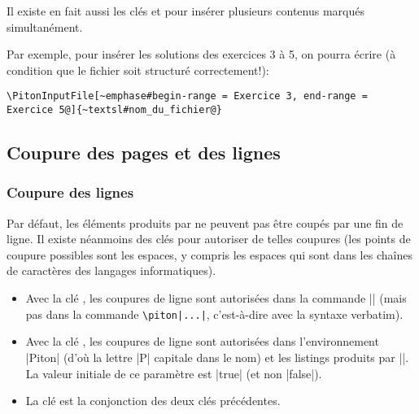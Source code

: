 \documentclass[dvipsnames,svgnames]{article}
\begin{document}
\bigskip
{}  Il existe en fait aussi les clés
 et  pour insérer plusieurs contenus marqués
simultanément.

Par exemple, pour insérer les solutions des exercices 3 à 5, on pourra écrire (à condition
que le fichier soit structuré correctement!):

\begin{Verbatim}
\PitonInputFile[~emphase#begin-range = Exercice 3, end-range = Exercice 5@]{~textsl#nom_du_fichier@}
\end{Verbatim}




\subsection{Coupure des pages et des lignes}

\label{breakable}

\subsubsection{Coupure des lignes}

\label{line-breaks}

Par défaut, les éléments produits par  ne peuvent pas être coupés par une fin
de ligne. Il existe néanmoins des clés pour autoriser de telles coupures (les points de
coupure possibles sont les espaces, y compris les espaces qui sont dans les chaînes de
caractères des langages informatiques).
\begin{itemize}
\item {} Avec la clé
, les coupures de ligne sont autorisées dans la commande
|| (mais pas dans la commande \verb+\piton|...|+, c'est-à-dire avec la syntaxe
verbatim).

\item {} Avec la clé
, les coupures de ligne sont autorisées dans
l'environnement |{Piton}| (d'où la lettre |P| capitale dans le nom) et les
listings produits par |\PitonInputFile|. La valeur initiale de ce paramètre est
|true| (et non |false|).

\item {} La clé  est la conjonction des deux clés
précédentes.
\end{itemize}
\end{document}
